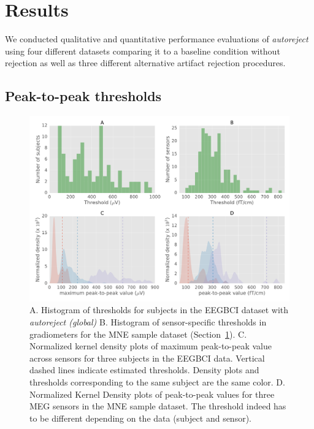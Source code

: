 \section{Results}
\label{sec:results}

We conducted qualitative and quantitative performance evaluations of \emph{autoreject} using four different datasets comparing it to a baseline condition without rejection as well as three different alternative artifact rejection procedures.

\subsection{Peak-to-peak thresholds}

\begin{figure}[htb!]
	\centering
	\includegraphics[width=0.9\linewidth]{figures/figure6.pdf}
    \caption[Histograms and kernel density plots of peak-to-peak thresholds.]{A. Histogram of thresholds for subjects in the EEGBCI dataset with \emph{autoreject (global)} B. Histogram of sensor-specific thresholds in gradiometers for the MNE sample dataset (Section~\ref{sec:results}). C. Normalized kernel density plots of maximum peak-to-peak value across sensors for three subjects in the EEGBCI data. Vertical dashed lines indicate estimated thresholds. Density plots and thresholds corresponding to the same subject are the same color. D. Normalized Kernel Density plots of peak-to-peak values for three MEG sensors in the MNE sample dataset. The threshold indeed has to be different depending on the data (subject and sensor).}
    \label{fig:hist}
\end{figure}

